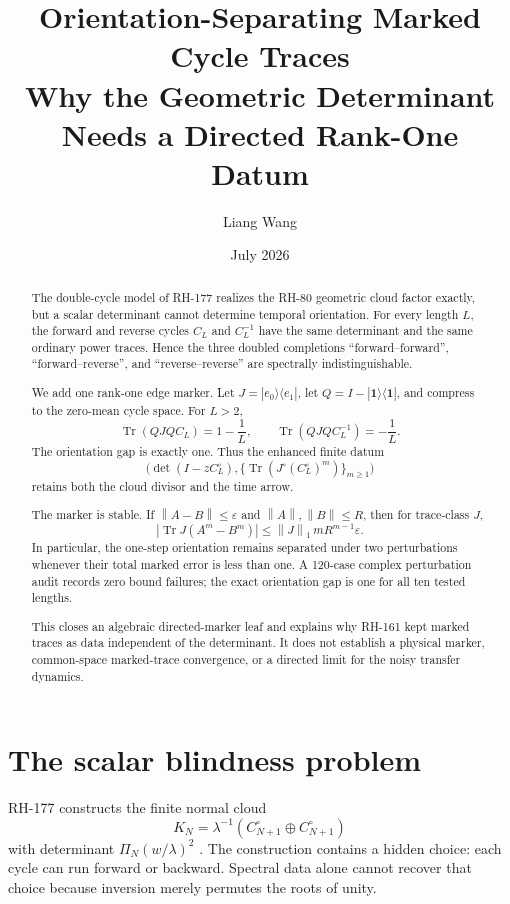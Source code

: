 \documentclass[12pt]{article}
\title{Orientation-Separating Marked Cycle Traces\\
\large Why the Geometric Determinant Needs a Directed Rank-One Datum}
\author{Liang Wang}
\date{July 2026}
\theoremstyle{remark}
\newcommand{\Tr}{\operatorname{Tr}}
\newcommand{\norm}[1]{\left\lVert#1\right\rVert}
\begin{document}
\maketitle

\begin{abstract}
The double-cycle model of RH-177 realizes the RH-80 geometric cloud factor
exactly, but a scalar determinant cannot determine temporal orientation.
For every length $L$, the forward and reverse cycles $C_L$ and $C_L^{-1}$
have the same determinant and the same ordinary power traces.  Hence the
three doubled completions ``forward--forward'', ``forward--reverse'', and
``reverse--reverse'' are spectrally indistinguishable.

We add one rank-one edge marker.  Let
$J=|e_0\rangle\langle e_1|$, let
$Q=I-|\mathbf1\rangle\langle\mathbf1|$, and compress to the zero-mean cycle
space.  For $L>2$,
\[
 \Tr(QJQ C_L)=1-\frac1L,
 \qquad
 \Tr(QJQ C_L^{-1})=-\frac1L.
\]
The orientation gap is exactly one.  Thus the enhanced finite datum
\[
 \bigl(\det(I-zC_L^\circ),
 \{\Tr(J^\circ(C_L^\circ)^m)\}_{m\ge1}\bigr)
\]
retains both the cloud divisor and the time arrow.

The marker is stable.  If $\norm{A-B}\le\varepsilon$ and
$\norm A,\norm B\le R$, then for trace-class $J$,
\[
 |\Tr J(A^m-B^m)|
 \le \norm J_1\,mR^{m-1}\varepsilon.
\]
In particular, the one-step orientation remains separated under two
perturbations whenever their total marked error is less than one.  A
120-case complex perturbation audit records zero bound failures; the exact
orientation gap is one for all ten tested lengths.

This closes an algebraic directed-marker leaf and explains why RH-161 kept
marked traces as data independent of the determinant.  It does not establish
a physical marker, common-space marked-trace convergence, or a directed limit
for the noisy transfer dynamics.
\end{abstract}

\section{The scalar blindness problem}

RH-177 constructs the finite normal cloud
\[
 K_N=\lambda^{-1}(C_{N+1}^\circ\oplus C_{N+1}^\circ)
\]
with determinant $\Pi_N(w/\lambda)^2$ \citep{WangRH177}.  The construction
contains a hidden choice: each cycle can run forward or backward.  Spectral
data alone cannot recover that choice because inversion merely permutes the
roots of unity.
\end{document}
